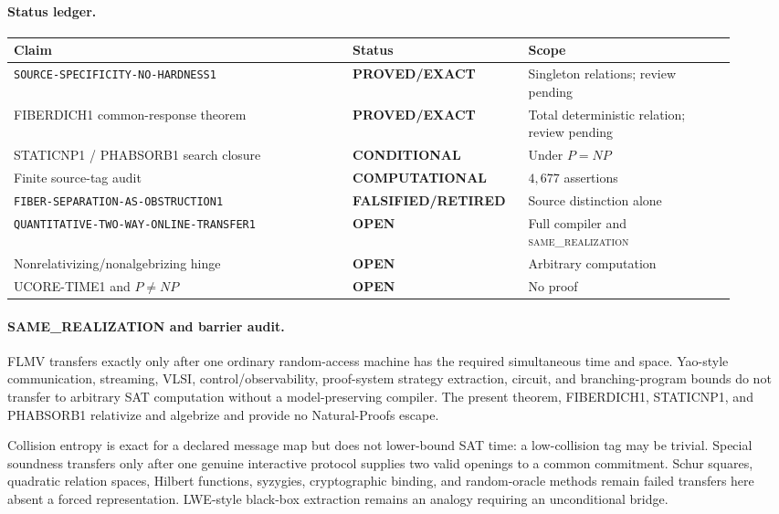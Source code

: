 \documentclass[11pt]{article}
\newcommand{\statusproved}{\textcolor{proved}{\textbf{PROVED/EXACT}}}
\newcommand{\statusopen}{\textcolor{openstatus}{\textbf{OPEN}}}
\newcommand{\statusretired}{\textcolor{retired}{\textbf{FALSIFIED/RETIRED}}}
\newcommand{\same}{\textnormal{\textsc{same\_realization}}}
\begin{document}
\paragraph{Status ledger.}
\begin{center}\scriptsize
\begin{tabular}{>{\raggedright\arraybackslash}p{0.44\linewidth}>{\raggedright\arraybackslash}p{0.21\linewidth}>{\raggedright\arraybackslash}p{0.27\linewidth}}
\toprule
Claim & Status & Scope\\ \midrule
\texttt{SOURCE-SPECIFICITY-NO-HARDNESS1} & \statusproved & Singleton relations; review pending\\
FIBERDICH1 common-response theorem & \statusproved & Total deterministic relation; review pending\\
STATICNP1 / PHABSORB1 search closure & \textbf{CONDITIONAL} & Under $P=NP$\\
Finite source-tag audit & \textbf{COMPUTATIONAL} & $4{,}677$ assertions\\
\texttt{FIBER-SEPARATION-AS-OBSTRUCTION1} & \statusretired & Source distinction alone\\
\texttt{QUANTITATIVE-TWO-WAY-ONLINE-TRANSFER1} & \statusopen & Full compiler and \same\\
Nonrelativizing/nonalgebrizing hinge & \statusopen & Arbitrary computation\\
UCORE-TIME1 and $P\ne NP$ & \statusopen & No proof\\
\bottomrule
\end{tabular}
\end{center}

\paragraph{SAME\_REALIZATION and barrier audit.}
FLMV transfers exactly only after one ordinary random-access machine has the
required simultaneous time and space.  Yao-style communication, streaming,
VLSI, control/observability, proof-system strategy extraction, circuit, and
branching-program bounds do not transfer to arbitrary SAT computation without
a model-preserving compiler.  The present theorem, FIBERDICH1, STATICNP1, and
PHABSORB1 relativize and algebrize and provide no Natural-Proofs escape.

Collision entropy is exact for a declared message map but does not lower-bound
SAT time: a low-collision tag may be trivial.  Special soundness transfers
only after one genuine interactive protocol supplies two valid openings to a
common commitment.  Schur squares, quadratic relation spaces, Hilbert
functions, syzygies, cryptographic binding, and random-oracle methods remain
failed transfers here absent a forced representation.  LWE-style black-box
extraction remains an analogy requiring an unconditional bridge.
\end{document}
